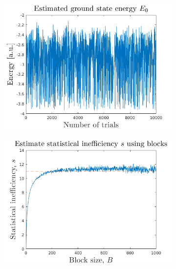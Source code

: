 \begin{figure}[H]
	\centering
	\captionsetup[subfigure]{justification=centering}
	\begin{subfigure}[b]{0.7\textwidth}
		\centering
		\includegraphics[width=\textwidth]{graphics/task2/local_energy.png}
		\caption{}
		\label{fig:block_error_a}
	\end{subfigure}
	\begin{subfigure}[b]{0.7\textwidth}
		\centering
		\includegraphics[width=\textwidth]{graphics/task2/block_error.png}
		\caption{}
		\label{fig:block_error_b}
	\end{subfigure}
	\begin{subfigure}[b]{0.7\textwidth}
		\centering

\end{subfigure}
\end{figure}
